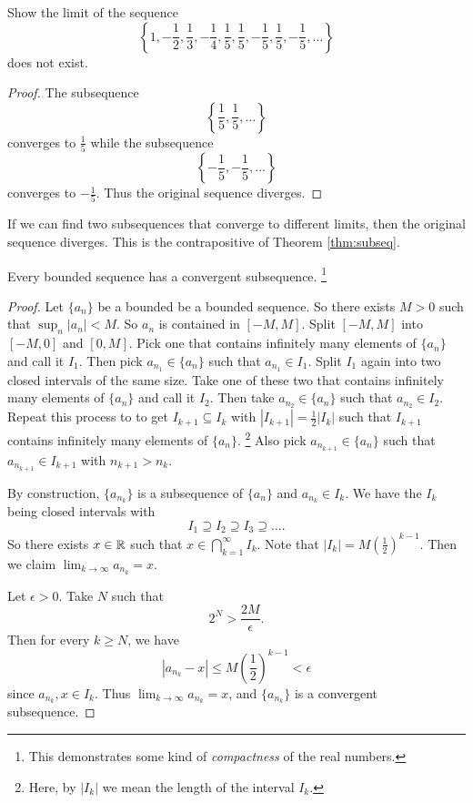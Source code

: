 \begin{exercise}
  Show the limit of the sequence
  \[
    \left\{1, -\frac{1}{2}, \frac{1}{3}, -\frac{1}{4}, \frac{1}{5}, \frac{1}{5}, -\frac{1}{5}, \frac{1}{5}, -\frac{1}{5}, \dots\right\}
  \]
  does not exist.
\end{exercise}

\begin{proof}
  The subsequence
  \[\left\{\frac{1}{5}, \frac{1}{5}, \dots\right\}\]
  converges to $\frac{1}{5}$ while the subsequence
  \[\left\{-\frac{1}{5}, -\frac{1}{5}, \dots\right\}\]
  converges to $-\frac{1}{5}$. Thus the original
  sequence diverges.
\end{proof}

\begin{remark}
  If we can find two subsequences that converge to different
  limits, then the original sequence diverges.
  This is the contrapositive of Theorem \ref{thm:subseq}.
\end{remark}

\begin{theorem}
  Every bounded sequence has a convergent subsequence.
  \footnote{This demonstrates some kind of
    \textit{compactness} of the real numbers.}
\end{theorem}

\begin{proof}
  Let $\{a_n\}$ be a bounded  be a bounded sequence.
  So there exists $M > 0$ such that $\sup_{n} |a_n| < M$.
  So $a_n$ is contained in $[-M, M]$. Split
  $[-M, M]$ into $[-M, 0]$ and $[0, M]$.
  Pick one that contains infinitely many elements of
  $\{a_n\}$ and call it $I_1$. Then pick
  $a_{n_1} \in \{a_n\}$ such that $a_{n_1} \in I_1$.
  Split $I_1$ again into two closed intervals of
  the same size. Take one of these two that contains
  infinitely many elements of $\{a_n\}$ and call it $I_2$.
  Then take $a_{n_2} \in \{a_n\}$ such that
  $a_{n_2} \in I_2$. Repeat this process to to get
  $I_{k+1} \subseteq I_k$ with
  $|I_{k+1}| = \frac{1}{2}|I_k|$ such that $I_{k+1}$
  contains infinitely many elements of $\{a_n\}$.
  \footnote{Here, by $|I_k|$ we mean the length of the
    interval $I_k$.}
  Also pick $a_{n_{k+1}} \in \{a_n\}$ such that
  $a_{n_{k+1}} \in I_{k+1}$ with $n_{k + 1} > n_k$.
  
  By construction, $\{a_{n_k}\}$ is a subsequence of
  $\{a_n\}$ and $a_{n_k} \in I_k$. We have the
  $I_k$ being closed intervals with
  \[
  I_1 \supseteq I_2 \supseteq I_3 \supseteq \dots
  .\]
  So there exists $x \in \mathbb{R}$ such that
  $x \in \bigcap_{k = 1}^{\infty} I_k$. Note that
  $|I_k| = M\left(\frac{1}{2}\right)^{k-1}$. Then we claim
  $\lim_{k \to \infty} a_{n_k} = x$.

  Let $\epsilon > 0$. Take $N$ such that
  \[2^N > \frac{2M}{\epsilon}.\]
  Then for every $k \ge N$, we have
  \[
    |a_{n_k} - x| \le M \left(\frac{1}{2}\right)^{k - 1}
    < \epsilon
  \]
  since $a_{n_k}, x \in I_k$.
  Thus $\lim_{k \to \infty} a_{n_k} = x$, and
  $\{a_{n_k}\}$ is a convergent subsequence.
\end{proof}
